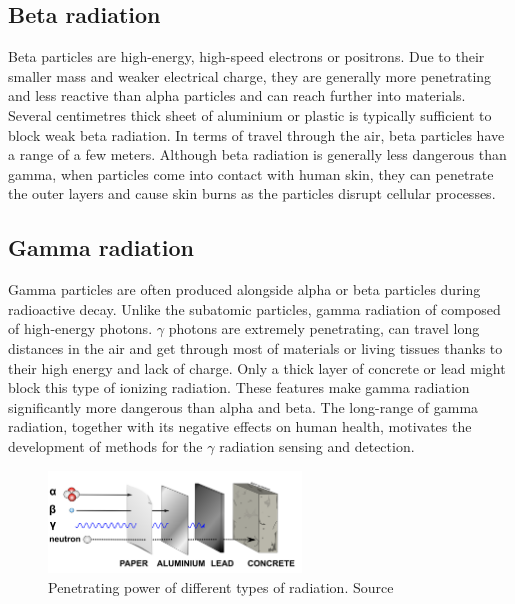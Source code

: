 \subsection{Beta radiation}
Beta particles are high-energy, high-speed electrons or positrons.
Due to their smaller mass and weaker electrical charge, they are generally more penetrating and less reactive than alpha particles and can reach further into materials.
Several centimetres thick sheet of aluminium or plastic is typically sufficient to block weak beta radiation.
In terms of travel through the air, beta particles have a range of a few meters.
Although beta radiation is generally less dangerous than gamma, when particles come into contact with human skin, they can penetrate the outer layers and cause skin burns as the particles disrupt cellular processes.

\subsection{Gamma radiation}
Gamma particles are often produced alongside alpha or beta particles during radioactive decay. 
Unlike the subatomic particles, gamma radiation of composed of high-energy photons. 
$\gamma$ photons are extremely penetrating, can travel long distances in the air and get through most of materials or living tissues thanks to their high energy and lack of charge.
Only a thick layer of concrete or lead might block this type of ionizing radiation.
These features make gamma radiation significantly more dangerous than alpha and beta.
The long-range of gamma radiation, together with its negative effects on human health, motivates the development of methods for the $\gamma$ radiation sensing and detection.
  \begin{figure}[!h]
    \centering
      \includegraphics[width=0.6\textwidth]{./fig/photos/pene2.png}
    \caption[x]{Penetrating power of different types of radiation. Source\protect\footnotemark}%
  \end{figure}

